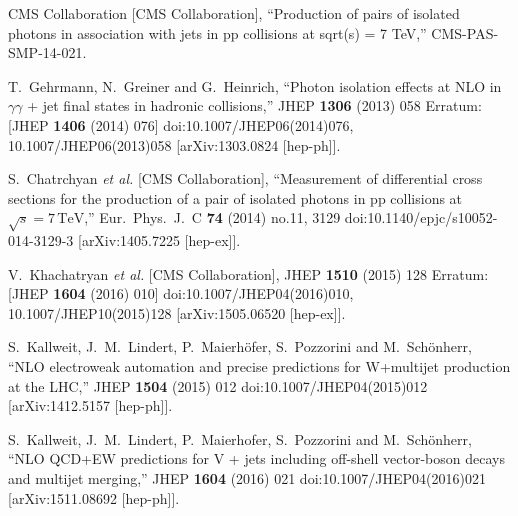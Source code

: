 \documentclass{PoS}
\begin{document}
\begin{thebibliography}{99}
  CMS Collaboration [CMS Collaboration],
  ``Production of pairs of isolated photons in association with jets in pp collisions at sqrt(s) = 7 TeV,''
  CMS-PAS-SMP-14-021.

  T.~Gehrmann, N.~Greiner and G.~Heinrich,
  ``Photon isolation effects at NLO in $\gamma \gamma$ + jet final states in hadronic collisions,''
  JHEP {\bf 1306} (2013) 058
   Erratum: [JHEP {\bf 1406} (2014) 076]
  doi:10.1007/JHEP06(2014)076, 10.1007/JHEP06(2013)058
  [arXiv:1303.0824 [hep-ph]].

  S.~Chatrchyan {\it et al.} [CMS Collaboration],
  ``Measurement of differential cross sections for the production of a pair of isolated photons in pp collisions at $\sqrt{s}=7\,\text {TeV} $,''
  Eur.\ Phys.\ J.\ C {\bf 74} (2014) no.11,  3129
  doi:10.1140/epjc/s10052-014-3129-3
  [arXiv:1405.7225 [hep-ex]].

  V.~Khachatryan {\it et al.} [CMS Collaboration],
  JHEP {\bf 1510} (2015) 128
   Erratum: [JHEP {\bf 1604} (2016) 010]
  doi:10.1007/JHEP04(2016)010, 10.1007/JHEP10(2015)128
  [arXiv:1505.06520 [hep-ex]].

  S.~Kallweit, J.~M.~Lindert, P.~Maierhöfer, S.~Pozzorini and M.~Schönherr,
  ``NLO electroweak automation and precise predictions for W+multijet production at the LHC,''
  JHEP {\bf 1504} (2015) 012
  doi:10.1007/JHEP04(2015)012
  [arXiv:1412.5157 [hep-ph]].

  S.~Kallweit, J.~M.~Lindert, P.~Maierhofer, S.~Pozzorini and M.~Schönherr,
  ``NLO QCD+EW predictions for V + jets including off-shell vector-boson decays and multijet merging,''
  JHEP {\bf 1604} (2016) 021
  doi:10.1007/JHEP04(2016)021
  [arXiv:1511.08692 [hep-ph]].

\end{thebibliography}
\end{document}

